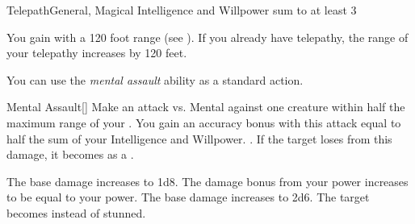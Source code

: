     \begin{magicalfeat}{Telepath}{General, Magical}
        \featpre Intelligence and Willpower sum to at least 3

         You gain  with a 120 foot range (see ).
        If you already have telepathy, the range of your telepathy increases by 120 feet.

         You can use the \textit{mental assault} ability as a standard action.
        \begin{magicalactiveability}{Mental Assault}[]
            \rankline
            Make an attack vs. Mental against one creature within half the maximum range of your .
            You gain an accuracy bonus with this attack equal to half the sum of your Intelligence and Willpower.
            \hit {}.
            If the target loses  from this damage, it becomes \stunned as a .

            \rankline
             The base damage increases to 1d8.
             The damage bonus from your power increases to be equal to your power.
             The base damage increases to 2d6.
             The target becomes \confused instead of stunned.
        \end{magicalactiveability}


\end{magicalfeat}
